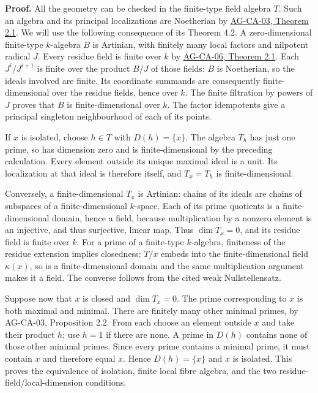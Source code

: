 \documentclass[11pt,a4paper,openany]{report}
\newcounter{none}
\begin{document}
\textbf{Proof.} All the geometry can be checked in the finite-type field algebra \(T\). Such an algebra and its principal localizations are Noetherian by \href{https://github.com/KokunoYumeto/open-math-courses/blob/d02d0a3669f42579db037cd44de1d113fdd770a1/docs/courses/AG-CA/src/noetherian-and-artinian-rings.md}{AG-CA-03, Theorem 2.1}. We will use the following consequence of its Theorem 4.2. A zero-dimensional finite-type \(k\)-algebra \(B\) is Artinian, with finitely many local factors and nilpotent radical \(J\). Every residue field is finite over \(k\) by \href{https://github.com/KokunoYumeto/open-math-courses/blob/d02d0a3669f42579db037cd44de1d113fdd770a1/docs/courses/AG-CA/src/the-nullstellensatz-and-jacobson-rings.md}{AG-CA-06, Theorem 2.1}. Each \(J^i/J^{i+1}\) is finite over the product \(B/J\) of those fields: \(B\) is Noetherian, so the ideals involved are finite. Its coordinate summands are consequently finite-dimensional over the residue fields, hence over \(k\). The finite filtration by powers of \(J\) proves that \(B\) is finite-dimensional over \(k\). The factor idempotents give a principal singleton neighbourhood of each of its points.

If \(x\) is isolated, choose \(h\in T\) with \(D(h)=\{x\}\). The algebra \(T_h\) has just one prime, so has dimension zero and is finite-dimensional by the preceding calculation. Every element outside its unique maximal ideal is a unit. Its localization at that ideal is therefore itself, and \(T_x=T_h\) is finite-dimensional.

Conversely, a finite-dimensional \(T_x\) is Artinian: chains of its ideals are chains of subspaces of a finite-dimensional \(k\)-space. Each of its prime quotients is a finite-dimensional domain, hence a field, because multiplication by a nonzero element is an injective, and thus surjective, linear map. Thus \(\dim T_x=0\), and its residue field is finite over \(k\). For a prime of a finite-type \(k\)-algebra, finiteness of the residue extension implies closedness: \(T/x\) embeds into the finite-dimensional field \(\kappa(x)\), so is a finite-dimensional domain and the same multiplication argument makes it a field. The converse follows from the cited weak Nullstellensatz.

Suppose now that \(x\) is closed and \(\dim T_x=0\). The prime corresponding to \(x\) is both maximal and minimal. There are finitely many other minimal primes, by AG-CA-03, Proposition 2.2. From each choose an element outside \(x\) and take their product \(h\); use \(h=1\) if there are none. A prime in \(D(h)\) contains none of those other minimal primes. Since every prime contains a minimal prime, it must contain \(x\) and therefore equal \(x\). Hence \(D(h)=\{x\}\) and \(x\) is isolated. This proves the equivalence of isolation, finite local fibre algebra, and the two residue-field/local-dimension conditions.
\end{document}

